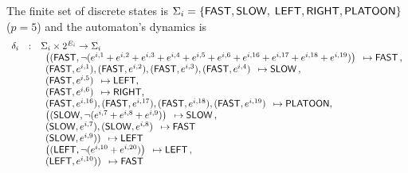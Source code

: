 The finite set of discrete states is $\Sigma_i=\{\mfast, \mslow,$ $\mleft, \mright,  \mplatoon\}$ ($p=5$) and the automaton's dynamics is 
\begin{equation*}
\begin{array}{rcl}
\delta_i & : & \Sigma_i \times 2^{E_i} \rightarrow \Sigma_i  \\
& & \begin{array}{l} \left((\mfast, \neg (e^{i,1} + e^{i, 2} + e^{i, 3} + e^{i, 4} + e^{i,5}
+ e^{i, 6} + e^{i, 16} + e^{i, 17} + e^{i, 18} + e^{i, 19})\right) \end{array} \mapsto \mfast \, , \\
& & \begin{array}{l} (\mfast, e^{i,1}), (\mfast, e^{i,2}), (\mfast, e^{i,3}), (\mfast, e^{i,4}) \end{array} \mapsto \mslow \, , \\
& & \begin{array}{l} (\mfast, e^{i,5}) \end{array} \mapsto \mleft, \\
& & \begin{array}{l} (\mfast, e^{i,6}) \end{array} \mapsto \mright, \\
& & \begin{array}{l} (\mfast, e^{i,16}), (\mfast, e^{i,17}), (\mfast, e^{i,18}), (\mfast, e^{i, 19}) \end{array} \mapsto \mplatoon, \\
& & \begin{array}{l} \left((\mslow, \neg (e^{i,7} + e^{i, 8} + e^{i, 9})\right) \end{array} \mapsto \mslow \, , \\
& & \begin{array}{l} (\mslow, e^{i,7}), (\mslow, e^{i,8}) \end{array} \mapsto \mfast 
\\
& & \begin{array}{l} (\mslow, e^{i,9})) \end{array} \mapsto \mleft 
\\
& & \begin{array}{l} \left((\mleft, \neg (e^{i,10} + e^{i, 20})\right) \end{array} \mapsto \mleft \, , \\
& & \begin{array}{l} (\mleft, e^{i,10})) \end{array} \mapsto \mfast 

\end{array}
\end{equation*}
